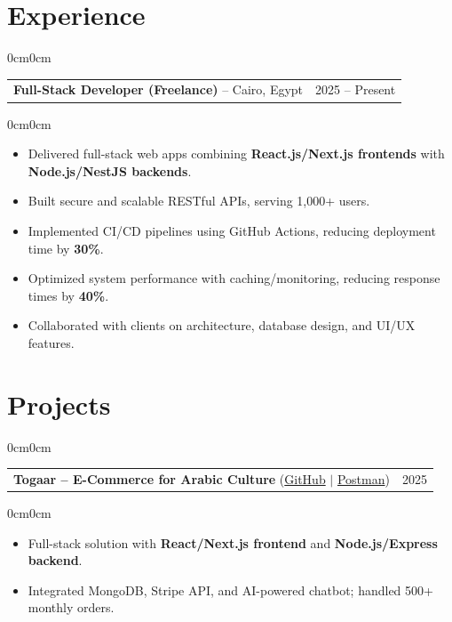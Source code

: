 \documentclass[10pt, letterpaper]{article}
\newenvironment{highlights}{
    \begin{itemize}[topsep=0.10 cm,parsep=0.10 cm,partopsep=0pt,itemsep=0pt,leftmargin=10pt]
}{
    \end{itemize}
}
\newenvironment{onecolentry}{\begin{adjustwidth}{0cm}{0cm}}{\end{adjustwidth}}
\begin{document}
\section{Experience}

\begin{adjustwidth}{0cm}{0cm}
\begin{tabularx}{\textwidth}{X r}
\textbf{Full-Stack Developer (Freelance)} – Cairo, Egypt & 2025 – Present \\
\end{tabularx}
\end{adjustwidth}

\begin{onecolentry}
\begin{highlights}
    \item Delivered full-stack web apps combining \textbf{React.js/Next.js frontends} with \textbf{Node.js/NestJS backends}.
    \item Built secure and scalable RESTful APIs, serving 1,000+ users.
    \item Implemented CI/CD pipelines using GitHub Actions, reducing deployment time by \textbf{30\%}.
    \item Optimized system performance with caching/monitoring, reducing response times by \textbf{40\%}.
    \item Collaborated with clients on architecture, database design, and UI/UX features.
\end{highlights}
\end{onecolentry}

\section{Projects}

\begin{adjustwidth}{0cm}{0cm}
\begin{tabularx}{\textwidth}{X r}
\textbf{Togaar – E-Commerce for Arabic Culture} (\href{https://github.com/HasanOmarHasan/Togaar-E-Commerce-for-Arabic-Culture}{GitHub} $|$  \href{https://documenter.getpostman.com/view/32860449/2sB3HtFcZn}{Postman}) & 2025 \\
\end{tabularx}
\end{adjustwidth}
\begin{onecolentry}
\begin{highlights}
    \item Full-stack solution with \textbf{React/Next.js frontend} and \textbf{Node.js/Express backend}.
    \item Integrated MongoDB, Stripe API, and AI-powered chatbot; handled 500+ monthly orders.
\end{highlights}
\end{onecolentry}
\end{document}
